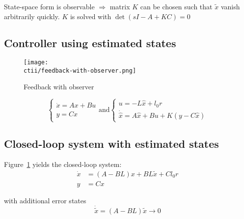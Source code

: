 \begin{multicols}{2}
State-space form is observable $\Rightarrow$ matrix $K$ can be chosen such that $\tilde{x}$ vanish arbitrarily quickly.
$K$ is solved with $\det(sI - A + KC) = 0$


\subsection{Controller using estimated states}
\begin{figure}[H]
    \centering
    \texttt{[image: \\ctii/feedback-with-observer.png]}
    \caption{Feedback with observer}
    \label{fig:feedback-with-observer}
\end{figure}


\begin{equation*}
\left\{\begin{array} { l } 
    { \dot{x} = Ax + Bu } \\
    { y = Cx }
    \end{array} \text{and} \left\{\begin{array}{l}
    u = -L\hat{x} + l_0 r \\
    \dot{\hat{x}} = A\hat{x} + Bu + K(y-C\hat{x})
    \end{array}\right.\right.
\end{equation*}



\subsection{Closed-loop system with estimated states}
Figure~\ref{fig:feedback-with-observer} yields the closed-loop system:
\begin{align*}
    \dot{x} &= (A-BL)x + BL\tilde{x} + Cl_0r  \\
    y &= Cx
\end{align*}

with additional error states 
\begin{equation*}
    \dot{\tilde{x}} = (A-BL)\tilde{x} \to 0
\end{equation*}


\end{multicols}
